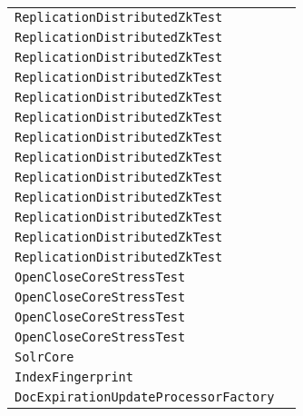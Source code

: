 \begin{center}
\begin{tabular}{ll}
\lstinline/ReplicationDistributedZkTest/&\raisebox{0pt}{\lstinline/testBatchBoundaries()/}\\
\lstinline/ReplicationDistributedZkTest/&\raisebox{0pt}{\lstinline/testBatchBoundaries()/}\\
\lstinline/ReplicationDistributedZkTest/&\raisebox{0pt}{\lstinline/testBatchBoundaries()/}\\
\lstinline/ReplicationDistributedZkTest/&\raisebox{0pt}{\lstinline/testBatchBoundaries()/}\\
\lstinline/ReplicationDistributedZkTest/&\raisebox{0pt}{\lstinline/testBatchBoundaries()/}\\
\lstinline/ReplicationDistributedZkTest/&\raisebox{0pt}{\lstinline/testBatchBoundaries()/}\\
\lstinline/ReplicationDistributedZkTest/&\raisebox{0pt}{\lstinline/testBatchBoundaries()/}\\
\lstinline/ReplicationDistributedZkTest/&\raisebox{0pt}{\lstinline/testBatchBoundaries()/}\\
\lstinline/ReplicationDistributedZkTest/&\raisebox{0pt}{\lstinline/testBatchBoundaries()/}\\
\lstinline/ReplicationDistributedZkTest/&\raisebox{0pt}{\lstinline/testBatchBoundaries()/}\\
\lstinline/ReplicationDistributedZkTest/&\raisebox{0pt}{\lstinline/testBatchBoundaries()/}\\
\lstinline/ReplicationDistributedZkTest/&\raisebox{0pt}{\lstinline/testBatchBoundaries()/}\\
\lstinline/ReplicationDistributedZkTest/&\raisebox{0pt}{\lstinline/testBatchBoundaries()/}\\
\lstinline/OpenCloseCoreStressTest/&\raisebox{0pt}{\lstinline/checkResults(HttpSolrClient)/}\\
\lstinline/OpenCloseCoreStressTest/&\raisebox{0pt}{\lstinline/checkResults(HttpSolrClient)/}\\
\lstinline/OpenCloseCoreStressTest/&\raisebox{0pt}{\lstinline/checkResults(HttpSolrClient)/}\\
\lstinline/OpenCloseCoreStressTest/&\raisebox{0pt}{\lstinline/checkResults(HttpSolrClient)/}\\
\lstinline/SolrCore/&\raisebox{0pt}{\lstinline/checkStale()/}\\
\lstinline/IndexFingerprint/&\raisebox{0pt}{\lstinline/getFingerprint(long)/}\\
\lstinline/DocExpirationUpdateProcessorFactory/&\raisebox{0pt}{\lstinline/amInChargeOfPeriodicDeletes()/}\\

\end{tabular}
\end{center}
